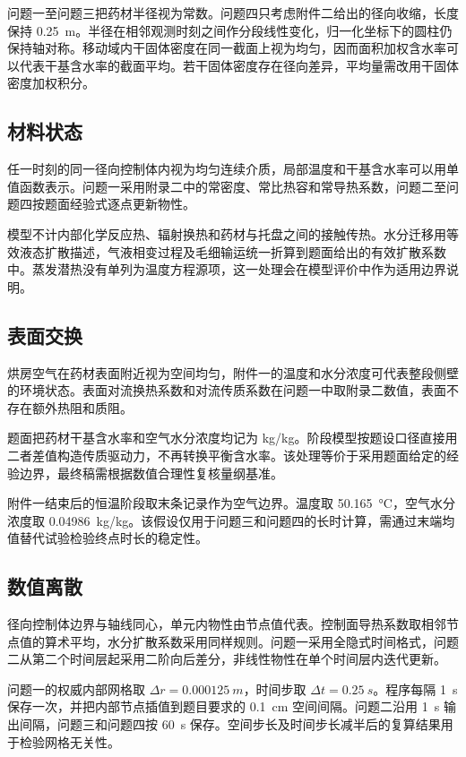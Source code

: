 \documentclass[withoutpreface,bwprint]{cumcmthesis}
\begin{document}
问题一至问题三把药材半径视为常数。问题四只考虑附件二给出的径向收缩，长度保持 \SI{0.25}{m}。半径在相邻观测时刻之间作分段线性变化，归一化坐标下的圆柱仍保持轴对称。移动域内干固体密度在同一截面上视为均匀，因而面积加权含水率可以代表干基含水率的截面平均。若干固体密度存在径向差异，平均量需改用干固体密度加权积分。

\subsection{材料状态}

任一时刻的同一径向控制体内视为均匀连续介质，局部温度和干基含水率可以用单值函数表示。问题一采用附录二中的常密度、常比热容和常导热系数，问题二至问题四按题面经验式逐点更新物性。

模型不计内部化学反应热、辐射换热和药材与托盘之间的接触传热。水分迁移用等效液态扩散描述，气液相变过程及毛细输运统一折算到题面给出的有效扩散系数中。蒸发潜热没有单列为温度方程源项，这一处理会在模型评价中作为适用边界说明。

\subsection{表面交换}

烘房空气在药材表面附近视为空间均匀，附件一的温度和水分浓度可代表整段侧壁的环境状态。表面对流换热系数和对流传质系数在问题一中取附录二数值，表面不存在额外热阻和质阻。

题面把药材干基含水率和空气水分浓度均记为 \si{kg/kg}。阶段模型按题设口径直接用二者差值构造传质驱动力，不再转换平衡含水率。该处理等价于采用题面给定的经验边界，最终稿需根据数值合理性复核量纲基准。

附件一结束后的恒温阶段取末条记录作为空气边界。温度取 \SI{50.165}{\degreeCelsius}，空气水分浓度取 \SI{0.04986}{kg/kg}。该假设仅用于问题三和问题四的长时计算，需通过末端均值替代试验检验终点时长的稳定性。

\subsection{数值离散}

径向控制体边界与轴线同心，单元内物性由节点值代表。控制面导热系数取相邻节点值的算术平均，水分扩散系数采用同样规则。问题一采用全隐式时间格式，问题二从第二个时间层起采用二阶向后差分，非线性物性在单个时间层内迭代更新。

问题一的权威内部网格取 \(\Delta r=\SI{0.000125}{m}\)，时间步取 \(\Delta t=\SI{0.25}{s}\)。程序每隔 \SI{1}{s} 保存一次，并把内部节点插值到题目要求的 \SI{0.1}{cm} 空间间隔。问题二沿用 \SI{1}{s} 输出间隔，问题三和问题四按 \SI{60}{s} 保存。空间步长及时间步长减半后的复算结果用于检验网格无关性。
\end{document}
